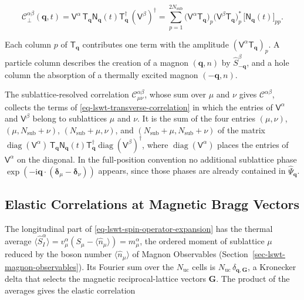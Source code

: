 \begin{equation}\label{eq-lswt-transverse-correlation}
\mathcal C_\perp^{\alpha\beta}(\mathbf q,t)
=\mathsf V^\alpha\,\mathsf T_{\mathbf q}\mathsf N_{\mathbf q}(t)\mathsf T_{\mathbf q}^\dagger\,(\mathsf V^\beta)^\dagger
=\sum_{p=1}^{2N_{\mathrm{sub}}}\big(\mathsf V^\alpha\mathsf T_{\mathbf q}\big)_p\big(\mathsf V^\beta\mathsf T_{\mathbf q}\big)_p^*\,\big[\mathsf N_{\mathbf q}(t)\big]_{pp}.
\end{equation}

Each column \(p\) of \(\mathsf T_{\mathbf q}\) contributes one term with the amplitude \((\mathsf V^\alpha\mathsf T_{\mathbf q})_p\). A particle column describes the creation of a magnon \((\mathbf q,n)\) by \(\hat S_{-\mathbf q}^\beta\), and a hole column the absorption of a thermally excited magnon \((-\mathbf q,n)\).

The sublattice-resolved correlation \(\mathcal C_{\mu\nu}^{\alpha\beta}\), whose sum over \(\mu\) and \(\nu\) gives \(\mathcal C^{\alpha\beta}\), collects the terms of \eqref{eq-lswt-transverse-correlation} in which the entries of \(\mathsf V^\alpha\) and \(\mathsf V^\beta\) belong to sublattices \(\mu\) and \(\nu\). It is the sum of the four entries \((\mu,\nu)\), \((\mu,N_{\mathrm{sub}}+\nu)\), \((N_{\mathrm{sub}}+\mu,\nu)\), and \((N_{\mathrm{sub}}+\mu,N_{\mathrm{sub}}+\nu)\) of the matrix \(\operatorname{diag}(\mathsf V^\alpha)\,\mathsf T_{\mathbf q}\mathsf N_{\mathbf q}(t)\mathsf T_{\mathbf q}^\dagger\operatorname{diag}(\mathsf V^\beta)^\dagger\), where \(\operatorname{diag}(\mathsf V^\alpha)\) places the entries of \(\mathsf V^\alpha\) on the diagonal. In the full-position convention no additional sublattice phase \(\exp(-\mathrm i\mathbf q\cdot(\boldsymbol\delta_\mu-\boldsymbol\delta_\nu))\) appears, since those phases are already contained in \(\hat\Psi_{\mathbf q}\).

\subsection{Elastic Correlations at Magnetic Bragg Vectors}

The longitudinal part of \eqref{eq-lswt-spin-operator-expansion} has the thermal average \(\langle\hat S_I^\alpha\rangle=v_\mu^\alpha(S_\mu-\langle\hat n_\mu\rangle)=m_\mu^\alpha\), the ordered moment of sublattice \(\mu\) reduced by the boson number \(\langle\hat n_\mu\rangle\) of Magnon Observables (Section~\ref{sec-lswt-magnon-observables}). Its Fourier sum over the \(N_{\mathrm{uc}}\) cells is \(N_{\mathrm{uc}}\,\delta_{\mathbf q,\mathbf G}\), a Kronecker delta that selects the magnetic reciprocal-lattice vectors \(\mathbf G\). The product of the averages gives the elastic correlation

